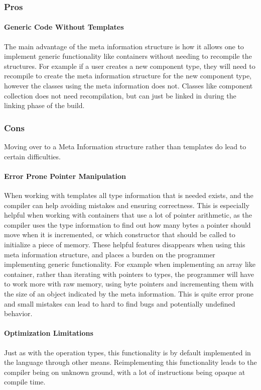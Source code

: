 \subsubsection{Pros}
\paragraph{Generic Code Without Templates}
The main advantage of the meta information structure is how it allows one to implement
generic functionality like containers without needing to recompile the structures.
For example if a user creates a new component type, they will need to recompile to create
the meta information structure for the new component type, however the classes using the
meta information does not. Classes like component collection does not need recompilation,
but can just be linked in during the linking phase of the build.

\subsubsection{Cons}
Moving over to a Meta Information structure rather than templates do lead to certain difficulties.

\paragraph{Error Prone Pointer Manipulation}
When working with templates all type information that is needed exists, and the compiler can help avoiding mistakes and ensuring correctness.
This is especially helpful when working with containers that use a lot of pointer arithmetic,
as the compiler uses the type information to find out how many bytes a pointer should move
when it is incremented, or which constructor that should be called to initialize a piece of memory.
These helpful features disappears when using this meta information structure, and places a burden on the programmer implementing generic functionality.
For example when implementing an array like container,
rather than iterating with pointers to types, the programmer will have to work more with raw memory,
using byte pointers and incrementing them with the size of an object indicated by the meta information.
This is quite error prone and small mistakes can lead to hard to find bugs and potentially undefined behavior.

\paragraph{Optimization Limitations}
Just as with the operation types, this functionality is by default implemented in the language
through other means. Reimplementing this functionality leads to the compiler being on unknown
ground, with a lot of instructions being opaque at compile time.
